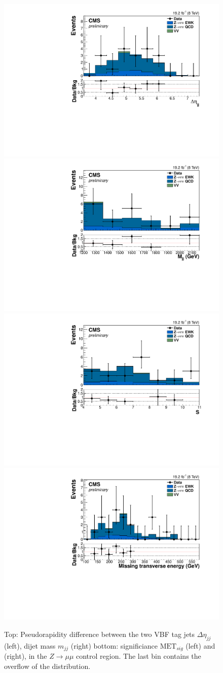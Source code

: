 \begin{figure}[h!]
\centering
\includegraphics[width=.49\textwidth]{Chapter07/Images/output_sigreg/mumu_dijet_deta.pdf}
\includegraphics[width=.49\textwidth]{Chapter07/Images/output_sigreg/mumu_dijet_M.pdf}
\includegraphics[width=.49\textwidth]{Chapter07/Images/output_sigreg/mumu_metnomu_significance.pdf}
\includegraphics[width=.49\textwidth]{Chapter07/Images/output_sigreg/mumu_metnomuons.pdf}
\caption{Top: Pseudorapidity difference between the two VBF tag jets $\Delta\eta_{jj}$ (left), dijet mass $m_{jj}$ (right) bottom: \MET significiance $\text{MET}_{sig}$ (left) and \MET (right), in the $Z\rightarrow \mu\mu$ control region. The last bin contains the overflow of the distribution.}
\label{fig:mumucontplots}
\end{figure}

